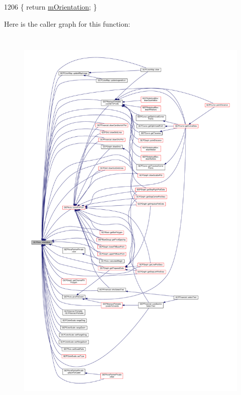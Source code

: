 \begin{DoxyCode}
1206 \{ \textcolor{keywordflow}{return} \hyperlink{class_q_c_p_axis_a048e1792fa86f4f86df55200b3f0be36}{mOrientation}; \}
\end{DoxyCode}


Here is the caller graph for this function\+:\nopagebreak
\begin{figure}[H]
\begin{center}
\leavevmode
\includegraphics[height=550pt]{class_q_c_p_axis_a57483f2f60145ddc9e63f3af53959265_icgraph}
\end{center}
\end{figure}


\hypertarget{class_q_c_p_axis_a9a68b3e45f1b1e33d4d807822342516c}{}
